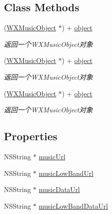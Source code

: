 \subsection*{Class Methods}
\begin{DoxyCompactItemize}
\item 
(\mbox{\hyperlink{interface_w_x_music_object}{W\+X\+Music\+Object}} $\ast$) + \mbox{\hyperlink{interface_w_x_music_object_a49035b71c92e1366fd87a938ac991f47}{object}}
\begin{DoxyCompactList}\small\item\em 返回一个\+W\+X\+Music\+Object对象 \end{DoxyCompactList}\item 
(\mbox{\hyperlink{interface_w_x_music_object}{W\+X\+Music\+Object}} $\ast$) + \mbox{\hyperlink{interface_w_x_music_object_a49035b71c92e1366fd87a938ac991f47}{object}}
\begin{DoxyCompactList}\small\item\em 返回一个\+W\+X\+Music\+Object对象 \end{DoxyCompactList}\item 
(\mbox{\hyperlink{interface_w_x_music_object}{W\+X\+Music\+Object}} $\ast$) + \mbox{\hyperlink{interface_w_x_music_object_a49035b71c92e1366fd87a938ac991f47}{object}}
\begin{DoxyCompactList}\small\item\em 返回一个\+W\+X\+Music\+Object对象 \end{DoxyCompactList}\end{DoxyCompactItemize}
\subsection*{Properties}
\begin{DoxyCompactItemize}
\item 
N\+S\+String $\ast$ \mbox{\hyperlink{interface_w_x_music_object_a0430402fa6325e64c1260d09756c6583}{music\+Url}}
\item 
N\+S\+String $\ast$ \mbox{\hyperlink{interface_w_x_music_object_ae5e1fd1ce13de3fe552c9b3c62648d23}{music\+Low\+Band\+Url}}
\item 
N\+S\+String $\ast$ \mbox{\hyperlink{interface_w_x_music_object_a817d12f99a342ac48524239d53f6736a}{music\+Data\+Url}}
\item 
N\+S\+String $\ast$ \mbox{\hyperlink{interface_w_x_music_object_a9299ec23a2bf1921f64ae18030f41649}{music\+Low\+Band\+Data\+Url}}
\end{DoxyCompactItemize}



